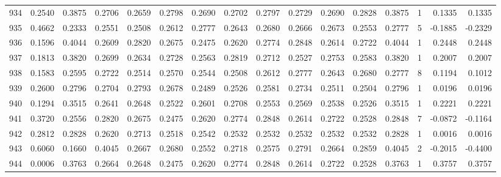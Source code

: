 \begin{tabular}{lrrrrrrrrrrrrrrr}
934 &      0.2540 &  0.3875 &  0.2706 &  0.2659 &  0.2798 &  0.2690 &  0.2702 &  0.2797 &  0.2729 &  0.2690 &   0.2828 &     0.3875 &      1 &                    0.1335 &                     0.1335 \\
935 &      0.4662 &  0.2333 &  0.2551 &  0.2508 &  0.2612 &  0.2777 &  0.2643 &  0.2680 &  0.2666 &  0.2673 &   0.2553 &     0.2777 &      5 &                   -0.1885 &                    -0.2329 \\
936 &      0.1596 &  0.4044 &  0.2609 &  0.2820 &  0.2675 &  0.2475 &  0.2620 &  0.2774 &  0.2848 &  0.2614 &   0.2722 &     0.4044 &      1 &                    0.2448 &                     0.2448 \\
937 &      0.1813 &  0.3820 &  0.2699 &  0.2634 &  0.2728 &  0.2563 &  0.2819 &  0.2712 &  0.2527 &  0.2753 &   0.2583 &     0.3820 &      1 &                    0.2007 &                     0.2007 \\
938 &      0.1583 &  0.2595 &  0.2722 &  0.2514 &  0.2570 &  0.2544 &  0.2508 &  0.2612 &  0.2777 &  0.2643 &   0.2680 &     0.2777 &      8 &                    0.1194 &                     0.1012 \\
939 &      0.2600 &  0.2796 &  0.2704 &  0.2793 &  0.2678 &  0.2489 &  0.2526 &  0.2581 &  0.2734 &  0.2511 &   0.2504 &     0.2796 &      1 &                    0.0196 &                     0.0196 \\
940 &      0.1294 &  0.3515 &  0.2641 &  0.2648 &  0.2522 &  0.2601 &  0.2708 &  0.2553 &  0.2569 &  0.2538 &   0.2526 &     0.3515 &      1 &                    0.2221 &                     0.2221 \\
941 &      0.3720 &  0.2556 &  0.2820 &  0.2675 &  0.2475 &  0.2620 &  0.2774 &  0.2848 &  0.2614 &  0.2722 &   0.2528 &     0.2848 &      7 &                   -0.0872 &                    -0.1164 \\
942 &      0.2812 &  0.2828 &  0.2620 &  0.2713 &  0.2518 &  0.2542 &  0.2532 &  0.2532 &  0.2532 &  0.2532 &   0.2532 &     0.2828 &      1 &                    0.0016 &                     0.0016 \\
943 &      0.6060 &  0.1660 &  0.4045 &  0.2667 &  0.2680 &  0.2552 &  0.2718 &  0.2575 &  0.2791 &  0.2664 &   0.2859 &     0.4045 &      2 &                   -0.2015 &                    -0.4400 \\
944 &      0.0006 &  0.3763 &  0.2664 &  0.2648 &  0.2475 &  0.2620 &  0.2774 &  0.2848 &  0.2614 &  0.2722 &   0.2528 &     0.3763 &      1 &                    0.3757 &                     0.3757 \\

\end{tabular}
